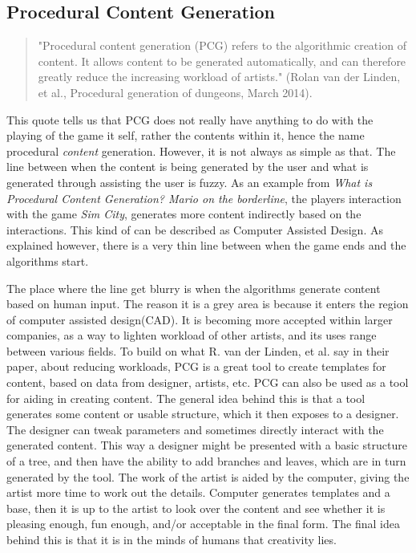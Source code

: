 \subsection{Procedural Content Generation}
\begin{quotation}
"Procedural content generation (PCG) refers to the algorithmic creation of content. It allows content to be generated automatically, and can therefore greatly reduce the increasing workload of artists." (Rolan van der Linden, et al., Procedural generation of dungeons, March 2014). \cite{art:pcg}
\end{quotation}
This quote tells us that PCG does not really have anything to do with the playing of the game it self, rather the contents within it, hence the name procedural \textit{content} generation. 
However, it is not always as simple as that. The line between when the content is being generated by the user and what is generated through assisting the user is fuzzy.
As an example from \textit{What is Procedural Content Generation? Mario on the borderline}\cite{art:whatpcg}, the players interaction with the game \textit{Sim City}, generates more content indirectly based on the interactions. This kind of can be described as Computer Assisted Design. As explained however, there is a very thin line between when the game ends and the algorithms start. 

The place where the line get blurry is when the algorithms generate content based on human input. The reason it is a grey area is because it enters the region of computer assisted design(CAD)\cite{book:cad}.
It is becoming more accepted within larger companies, as a way to lighten workload of other artists, and its uses range between various fields.
To build on what R. van der Linden, et al. say in their paper, about reducing workloads, PCG is a great tool to create templates for content, based on data from designer, artists, etc. PCG can also be used as a tool for aiding in creating content.  
The general idea behind this is that a tool generates some content or usable structure, which it then exposes to a designer. The designer can tweak parameters and sometimes directly interact with the generated content. This way a designer might be presented with a basic structure of a tree, and then have the ability to add branches and leaves, which are in turn generated by the tool. 
The work of the artist is aided by the computer, giving the artist more time to work out the details. Computer generates templates and a base, then it is up to the artist to look over the content and see whether it is pleasing enough, fun enough, and/or acceptable in the final form. The final idea behind this is that it is in the minds of humans that creativity lies. 

